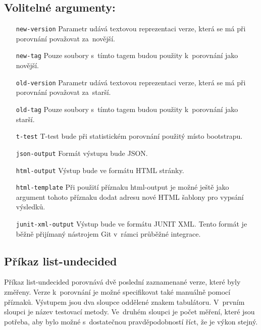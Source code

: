 \subsection*{Volitelné argumenty:}
\begin{itemize}[label=\texttt{\textbf{\textendash}}]
    \item[\texttt{new-version}] Parametr udává textovou reprezentaci verze, která se má při porovnání považovat za~novější.
    \item[\texttt{new-tag}]     Pouze soubory s~tímto tagem budou použity k~porovnání jako novější.
    \item[\texttt{old-version}] Parametr udává textovou reprezentaci verze, která se má při porovnání považovat za~starší.
    \item[\texttt{old-tag}]     Pouze soubory s~tímto tagem budou použity k~porovnání jako starší.
    \item[\texttt{t-test}]      T-test bude při statistickém porovnání použitý místo bootstrapu.
    \item[\texttt{json-output}] Formát výstupu bude JSON.
    \item[\texttt{html-output}] Výstup bude ve formátu HTML stránky.
    \item[\texttt{html-template}] Při použití příznaku html-output je možné ještě jako argument tohoto příznaku dodat adresu nové HTML šablony pro vypsání výsledků.
    \item[\texttt{junit-xml-output}] Výstup bude ve formátu JUNIT XML. Tento formát je běžně přijímaný nástrojem Git v~rámci průběžné integrace.
\end{itemize}

\subsection{Příkaz list-undecided}

Příkaz list-undecided porovnává dvě poslední zaznamenané verze, které byly změřeny.
Verze k~porovnání je možné specifikovat také manuálně pomocí příznaků. Výstupem
jsou dva sloupce oddělené znakem tabulátoru. V~prvním sloupci je název testovací metody.
Ve~druhém sloupci je počet měření, které jsou potřeba, aby bylo možné s~dostatečnou
pravděpodobností říct, že je výkon stejný.

